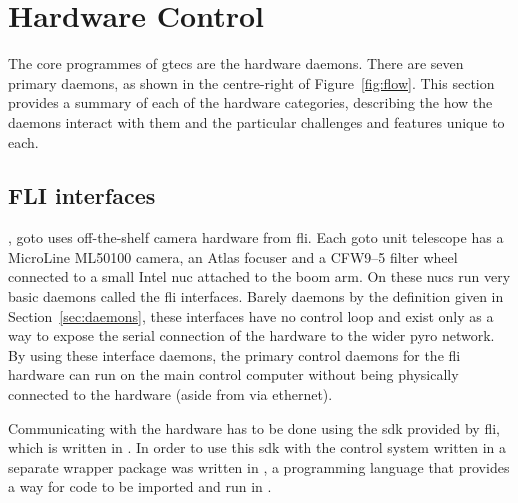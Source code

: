 \section{Hardware Control}
\label{sec:hardware_control}
\begin{colsection}


\begin{colsection}

The core programmes of \gls{gtecs} are the hardware daemons. There are seven primary daemons, as shown in the centre-right of Figure~\ref{fig:flow}. This section provides a summary of each of the hardware categories, describing the how the daemons interact with them and the particular challenges and features unique to each.

\end{colsection}


\subsection{FLI interfaces}
\label{sec:fli}
\begin{colsection}

, \gls{goto} uses off-the-shelf camera hardware from \gls{fli}. Each \gls{goto} unit telescope has a MicroLine ML50100 camera, an Atlas focuser and a CFW9--5 filter wheel connected to a small Intel \gls{nuc} attached to the boom arm. On these \glspl{nuc} run very basic daemons called the \gls{fli} interfaces. Barely daemons by the definition given in Section~\ref{sec:daemons}, these interfaces have no control loop and exist only as a way to expose the serial connection of the hardware to the wider \gls{pyro} network. By using these interface daemons, the primary control daemons for the \gls{fli} hardware can run on the main control computer without being physically connected to the hardware (aside from via ethernet).

Communicating with the hardware has to be done using the \gls{sdk} provided by \gls{fli}, which is written in . In order to use this \gls{sdk} with the control system written in  a separate wrapper package  was written in , a programming language that provides a way for  code to be imported and run in .


\end{colsection}
\end{colsection}
